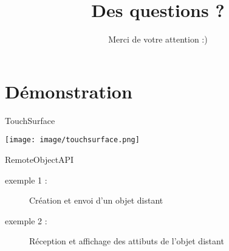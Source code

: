 \documentclass{beamer}
\begin{document}
\section{Démonstration}

\begin{frame}
  \tableofcontents[currentsection]
\end{frame}

\begin{frame}
  \begin{block}{TouchSurface}
    \begin{center}
      \texttt{[image: image/touchsurface.png]}
    \end{center}
  \end{block}
\end{frame}

\begin{frame}
  \begin{block}{RemoteObjectAPI}
    \begin{description}
      \item[exemple 1 :] Création et envoi d'un objet distant
      \item[exemple 2 :] Réception et affichage des attibuts de l'objet distant
    \end{description}
  \end{block}
\end{frame}

\begin{frame}
  \title{Des questions ?}
  \author{Merci de votre attention :)}
  \institute{}
  \date{}
  \maketitle
\end{frame}
\end{document}
